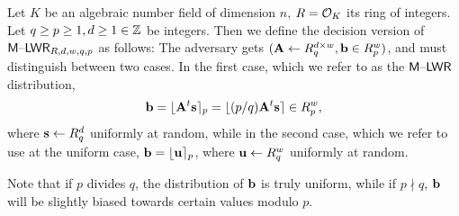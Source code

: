 \begin{definition}\label{def:mlwr} Let $K$ be an
  algebraic number field of dimension $n$,
$R=\mathcal{O}_{K}$ its ring of integers. Let $q\geq p \geq 1,d\geq 1 \in \mathbb{Z}$ be integers. Then we define the decision
version of $\mathsf{M \text{\textendash} LWR}_{R,d,w,q,p}$ as
follows:
The adversary gets
$(\mathbf{A} \gets R_q^{d \times w}, \mathbf{b} \in R_p^w)$, and must
distinguish between two cases. In the first case, which we refer to as
the $\mathsf{M \text{\textendash} LWR}$ distribution,
\[\mathbf{b} = \lfloor\mathbf{A}^t\mathbf{s}\rceil_{p} = \lfloor(p/q)\mathbf{A}^{t}\mathbf{s}\rceil \in R_p^w,\] where
$\mathbf{s} \gets R_q^d$ uniformly at random,  while in the second
case, which we refer to use at the uniform case, $\mathbf{b} = \lfloor\mathbf{u}\rceil_p$, where $\mathbf{u} \gets R_q^w$ uniformly
at random.
\end{definition}
Note that if $p$ divides $q$, the distribution of $\mathbf{b}$ is truly
uniform, while if $p \nmid q$, $\mathbf{b}$ will be slightly biased
towards certain values modulo $p$. 


